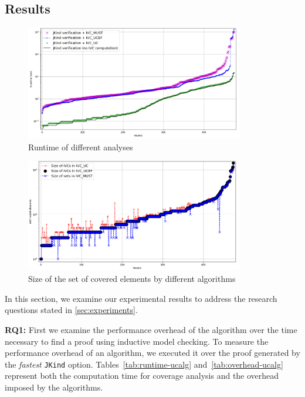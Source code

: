 \subsection{Results}
\label{sec:results}

\newcommand{\takeaway}[1]{
\vspace{6pt}
\noindent\fbox{\parbox{0.98\columnwidth}{#1}}
\vspace{6pt}
}

\begin{figure}
  \centering
  \includegraphics[width=0.85\textwidth]{figs/timing_analyses_all_sorted.png}
  \vspace{-0.1in}
  \caption{Runtime of different analyses}\label{fig:runtimeall}
\end{figure}

\begin{figure}
  \centering
  \includegraphics[width=0.85\textwidth]{figs/size.png}
  \vspace{-0.1in}
  \caption{Size of the set of covered elements by different algorithms}\label{fig:size}
\end{figure}

In this section, we examine our experimental results to address the research questions stated in \ref{sec:experiments}.

\textbf{RQ1:} First we examine the performance overhead of the \ucalg algorithm over the time necessary to find a proof using inductive model checking. To measure the performance overhead of an algorithm, we executed it over the proof generated by the {\em fastest} \texttt{JKind} option. Tables~\ref{tab:runtime-ucalg}
and~\ref{tab:overhead-ucalg} represent both the
computation time for coverage analysis
and the overhead imposed by the algorithms.

